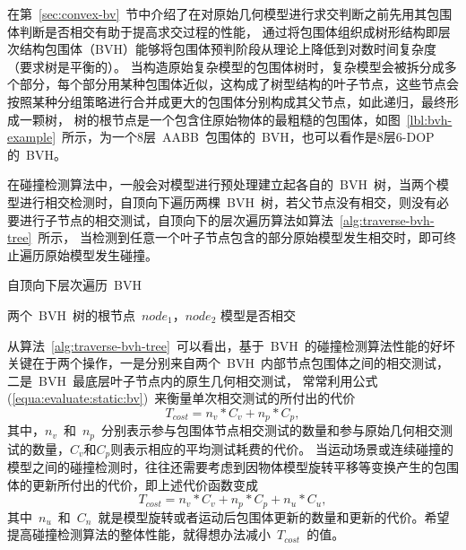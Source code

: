 在第~\ref{sec:convex-bv}~节中介绍了在对原始几何模型进行求交判断之前先用其包围体判断是否相交有助于提高求交过程的性能，
通过将包围体组织成树形结构即层次结构包围体（BVH）能够将包围体预判阶段从理论上降低到对数时间复杂度（要求树是平衡的）。
当构造原始复杂模型的包围体树时，复杂模型会被拆分成多个部分，每个部分用某种包围体近似，这构成了树型结构的叶子节点，这些节点会按照某种分组策略进行合并成更大的包围体分别构成其父节点，如此递归，最终形成一颗树，
树的根节点是一个包含住原始物体的最粗糙的包围体，如图~\ref{lbl:bvh-example}~所示，为一个8层~AABB~包围体的~BVH，也可以看作是8层6-DOP的~BVH。

在碰撞检测算法中，一般会对模型进行预处理建立起各自的~BVH~树，当两个模型进行相交检测时，自顶向下遍历两棵~BVH~树，若父节点没有相交，则没有必要进行子节点的相交测试，自顶向下的层次遍历算法如算法~\ref{alg:traverse-bvh-tree}~所示，
当检测到任意一个叶子节点包含的部分原始模型发生相交时，即可终止遍历原始模型发生碰撞。

\begin{algorithm}
\small
\caption{自顶向下层次遍历~BVH~}
\label{alg:traverse-bvh-tree}
\begin{algorithmic}[1]
\Require
两个~BVH~树的根节点~$node_1$，$node_2$
\Ensure
模型是否相交
    \State {} 
  \Else
           \State {}
           \State {}
           \Else
              \State {} 
              \EndFor
           \EndIf
      \Else
           \State {}  
           \EndFor
      \EndIf
  \EndIf
\EndFunction
\end{algorithmic}
\end{algorithm}
从算法~\ref{alg:traverse-bvh-tree}~可以看出，基于~BVH~的碰撞检测算法性能的好坏关键在于两个操作，一是分别来自两个~BVH~内部节点包围体之间的相交测试，二是~BVH~最底层叶子节点内的原生几何相交测试，
常常利用公式(\ref{equa:evaluate:static:bv})~来衡量单次相交测试的所付出的代价
\begin{equation}
T_{cost} = n_v * C_v + n_p * C_p,
\label{equa:evaluate:static:bv}
\end{equation}
其中，$n_v$~和~$n_p$~分别表示参与包围体节点相交测试的数量和参与原始几何相交测试的数量，$C_v$和$C_p$则表示相应的平均测试耗费的代价\cite{klosowski1998efficient}。
当运动场景或连续碰撞的模型之间的碰撞检测时，往往还需要考虑到因物体模型旋转平移等变换产生的包围体的更新所付出的代价，即上述代价函数变成
\begin{equation}
T_{cost} = n_v * C_v + n_p * C_p + n_u * C_u,
  \label{equa:evaluate:dynamic:bv}
\end{equation}
其中~$n_u$~和~$C_n$~就是模型旋转或者运动后包围体更新的数量和更新的代价。希望提高碰撞检测算法的整体性能，就得想办法减小~$T_{cost}$~的值。


